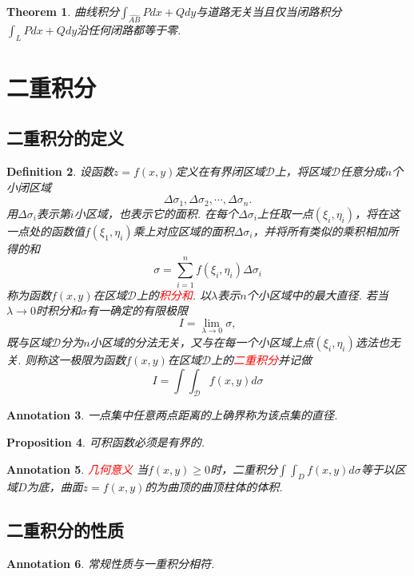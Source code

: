 \documentclass{article}
\newtheorem{theorem}{Theorem}[section]
\newtheorem{proposition}[theorem]{Proposition}
\newtheorem{definition}[theorem]{Definition}
\newtheorem{annotation}[theorem]{Annotation}
\newcommand{\redt}[1]{\textcolor{red}{#1}}
\begin{document}
\begin{theorem}
\rm 曲线积分$\int_{\widehat{AB}} Pdx+Qdy$与道路无关当且仅当闭路积分$\int_L Pdx+Qdy$沿任何闭路都等于零. 
\end{theorem}

\newpage
\section{二重积分}

\subsection{二重积分的定义}
\begin{definition}
\rm 设函数$z=f(x,y)$定义在有界闭区域$\mathcal{D}$上，将区域$\mathcal{D}$任意分成$n$个小闭区域
$$
\Delta\sigma_1,\Delta\sigma_2,\cdots,\Delta\sigma_n.
$$
用$\Delta\sigma_i$表示第$i$小区域，也表示它的面积. 在每个$\Delta\sigma_i$上任取一点$(\xi_i,\eta_i)$，将在这一点处的函数值$f(\xi_1,\eta_i)$乘上对应区域的面积$\Delta\sigma_i$，并将所有类似的乘积相加所得的和
$$
\sigma = \sum\limits_{i=1}^n f(\xi_i,\eta_i)\Delta\sigma_i
$$
称为函数$f(x,y)$在区域$\mathcal{D}$上的\redt{积分和}. 以$\lambda$表示$n$个小区域中的最大直径. 若当$\lambda \to 0$时积分和$\sigma$有一确定的有限极限
$$
I = \lim\limits_{\lambda \to 0}\sigma,
$$
既与区域$\mathcal{D}$分为$n$小区域的分法无关，又与在每一个小区域上点$(\xi_i,\eta_i)$选法也无关. 则称这一极限为函数$f(x,y)$在区域$\mathcal{D}$上的\redt{二重积分}并记做
$$
I = \int\int_{\mathcal{D}}f(x,y)d\mathcal{\sigma}
$$
\end{definition}

\begin{annotation}
\rm 一点集中任意两点距离的上确界称为该点集的直径. 
\end{annotation}

\begin{proposition}
\rm 可积函数必须是有界的.
\end{proposition}

\begin{annotation}
\rm \redt{几何意义} 当$f(x,y) \geq 0$时，二重积分$\int\int_D f(x,y)d\sigma$等于以区域$D$为底，曲面$z=f(x,y)$的为曲顶的曲顶柱体的体积. 
\end{annotation}

\subsection{二重积分的性质}

\begin{annotation}
\rm 常规性质与一重积分相符.
\end{annotation}
\end{document}
